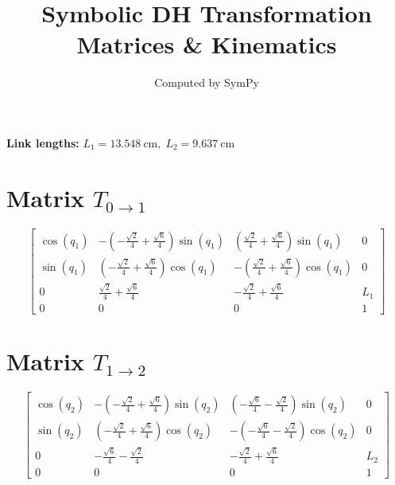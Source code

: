 \documentclass[11pt, a4paper]{article}
\title{Symbolic DH Transformation Matrices \& Kinematics}
\author{Computed by SymPy}
\date{}
\begin{document}
\maketitle
\noindent\textbf{Link lengths:} $L_1 = 13.548\ \text{cm},\; L_2 = 9.637\ \text{cm}$
\section*{Matrix $T_{0 \to 1}$}
\vspace{0.5cm}
$$\left[\begin{matrix}\cos{\left(q_{1} \right)} & - \left(- \frac{\sqrt{2}}{4} + \frac{\sqrt{6}}{4}\right) \sin{\left(q_{1} \right)} & \left(\frac{\sqrt{2}}{4} + \frac{\sqrt{6}}{4}\right) \sin{\left(q_{1} \right)} & 0\\\sin{\left(q_{1} \right)} & \left(- \frac{\sqrt{2}}{4} + \frac{\sqrt{6}}{4}\right) \cos{\left(q_{1} \right)} & - \left(\frac{\sqrt{2}}{4} + \frac{\sqrt{6}}{4}\right) \cos{\left(q_{1} \right)} & 0\\0 & \frac{\sqrt{2}}{4} + \frac{\sqrt{6}}{4} & - \frac{\sqrt{2}}{4} + \frac{\sqrt{6}}{4} & L_{1}\\0 & 0 & 0 & 1\end{matrix}\right]$$

\section*{Matrix $T_{1 \to 2}$}
\vspace{0.5cm}
$$\left[\begin{matrix}\cos{\left(q_{2} \right)} & - \left(- \frac{\sqrt{2}}{4} + \frac{\sqrt{6}}{4}\right) \sin{\left(q_{2} \right)} & \left(- \frac{\sqrt{6}}{4} - \frac{\sqrt{2}}{4}\right) \sin{\left(q_{2} \right)} & 0\\\sin{\left(q_{2} \right)} & \left(- \frac{\sqrt{2}}{4} + \frac{\sqrt{6}}{4}\right) \cos{\left(q_{2} \right)} & - \left(- \frac{\sqrt{6}}{4} - \frac{\sqrt{2}}{4}\right) \cos{\left(q_{2} \right)} & 0\\0 & - \frac{\sqrt{6}}{4} - \frac{\sqrt{2}}{4} & - \frac{\sqrt{2}}{4} + \frac{\sqrt{6}}{4} & L_{2}\\0 & 0 & 0 & 1\end{matrix}\right]$$
\end{document}
